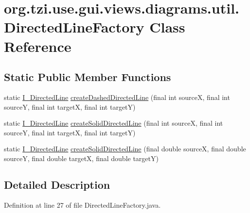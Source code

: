 \hypertarget{classorg_1_1tzi_1_1use_1_1gui_1_1views_1_1diagrams_1_1util_1_1_directed_line_factory}{\section{org.\-tzi.\-use.\-gui.\-views.\-diagrams.\-util.\-Directed\-Line\-Factory Class Reference}
\label{classorg_1_1tzi_1_1use_1_1gui_1_1views_1_1diagrams_1_1util_1_1_directed_line_factory}
}
\subsection*{Static Public Member Functions}
\begin{DoxyCompactItemize}
\item 
static \hyperlink{interfaceorg_1_1tzi_1_1use_1_1gui_1_1views_1_1diagrams_1_1util_1_1_i___directed_line}{I\-\_\-\-Directed\-Line} \hyperlink{classorg_1_1tzi_1_1use_1_1gui_1_1views_1_1diagrams_1_1util_1_1_directed_line_factory_a9ab453fde5ef847883a19ce5dce72a21}{create\-Dashed\-Directed\-Line} (final int source\-X, final int source\-Y, final int target\-X, final int target\-Y)
\item 
static \hyperlink{interfaceorg_1_1tzi_1_1use_1_1gui_1_1views_1_1diagrams_1_1util_1_1_i___directed_line}{I\-\_\-\-Directed\-Line} \hyperlink{classorg_1_1tzi_1_1use_1_1gui_1_1views_1_1diagrams_1_1util_1_1_directed_line_factory_ada014b3f36f17aa6b25a8c1cc6d8fa0a}{create\-Solid\-Directed\-Line} (final int source\-X, final int source\-Y, final int target\-X, final int target\-Y)
\item 
static \hyperlink{interfaceorg_1_1tzi_1_1use_1_1gui_1_1views_1_1diagrams_1_1util_1_1_i___directed_line}{I\-\_\-\-Directed\-Line} \hyperlink{classorg_1_1tzi_1_1use_1_1gui_1_1views_1_1diagrams_1_1util_1_1_directed_line_factory_a52d9e84ebe7048304899d792f21bcd30}{create\-Solid\-Directed\-Line} (final double source\-X, final double source\-Y, final double target\-X, final double target\-Y)
\end{DoxyCompactItemize}


\subsection{Detailed Description}


Definition at line 27 of file Directed\-Line\-Factory.\-java.



